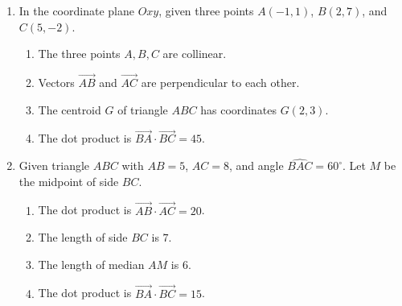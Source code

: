 \documentclass[10pt,a4paper]{article}
\begin{document}
\begin{enumerate}
\item In the coordinate plane $Oxy$, given three points $A(-1, 1)$, $B(2, 7)$, and $C(5, -2)$.
\begin{enumerate}
    \item The three points $A, B, C$ are collinear.
    \item Vectors $\vec{AB}$ and $\vec{AC}$ are perpendicular to each other.
    \item The centroid $G$ of triangle $ABC$ has coordinates $G(2, 3)$.
    \item The dot product is $\vec{BA} \cdot \vec{BC} = 45$.
\end{enumerate}

\item Given triangle $ABC$ with $AB = 5$, $AC = 8$, and angle $\widehat{BAC} = 60^\circ$. Let $M$ be the midpoint of side $BC$.
\begin{enumerate}
    \item The dot product is $\vec{AB} \cdot \vec{AC} = 20$.
    \item The length of side $BC$ is $7$.
    \item The length of median $AM$ is $6$.
    \item The dot product is $\vec{BA} \cdot \vec{BC} = 15$.
\end{enumerate}
\end{enumerate}
\end{document}
